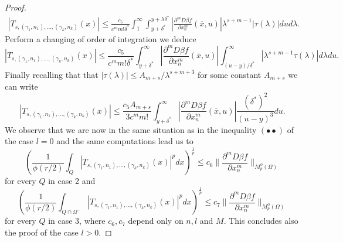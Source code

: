 \documentclass[12pt]{article}
\theoremstyle{definition}
\begin{document}
\begin{proof}
\begin{align*}
|T_{s,(\gamma_1,n_1),...,(\gamma_k,n_k)}(x) | \le \frac{c_5}{c^mm!\delta^*}\int_1^\infty \int_{y+\delta^*}^{y+\lambda \delta^*} \left|\frac{\partial^{m} D\beta f}{\partial x_n^{m} }(\overline x,u)\right |\lambda^{s+m-1} |\tau(\lambda)|du d\lambda.
\end{align*}
Perform a changing of order of integration we deduce
\[ |T_{s,(\gamma_1,n_1),...,(\gamma_k,n_k)}(x) | \le\frac{c_5}{c^mm!\delta^*}\int_{y+\delta^*}^{\infty} \left |\frac{\partial^{m} D\beta f}{\partial x_n^{m} }(\overline x,u)\right | \int_{(u-y)/\delta^*}^\infty |\lambda^{s+m-1} \tau(\lambda)| d\lambda du.\]
Finally recalling that that  $|\tau(\lambda)|\le A_{m+s}/\lambda^{s+m+3}$ for some constant $A_{m+s}$ we can write
\[ |T_{s,(\gamma_1,n_1),...,(\gamma_k,n_k)}(x) | \le\frac{c_5 A_{m+s}}{3c^mm!} \int_{y+\delta^*}^{\infty} \left |\frac{\partial^{m} D\beta f}{\partial x_n^{m} }(\overline x,u)\right | \frac{(\delta^*)^2}{(u-y)^3} du.\]
We observe that we are now in the same situation as in the inequality $(\bullet \bullet)$ of the case $l=0$ and the same computations lead us to
\[\left( \frac{1}{\phi(r/2)}\int_Q  \left| T_{s,(\gamma_1,n_1),...,(\gamma_k,n_k)}(x)\right|^p dx\right )^{\frac{1}{p}} \le c_6 \| \frac{\partial^{m} D\beta f}{\partial x_n^{m} } \|_{M_p^\phi(\Omega)} \] 
for every $Q$ in case 2  and
\[\left( \frac{1}{\phi(r/2)}\int_{Q\cap \Omega^-}  \left| T_{s,(\gamma_1,n_1),...,(\gamma_k,n_k)}(x)\right|^p dx\right )^{\frac{1}{p}} \le c_7 \| \frac{\partial^{m} D\beta f}{\partial x_n^{m} } \|_{M_p^\phi(\Omega)} \] 
for every $Q$ in case 3, where $c_6,c_7$ depend only on $n,l$ and $M$. This concludes also the proof of the case $l>0.$
\end{proof} 




\end{document}
